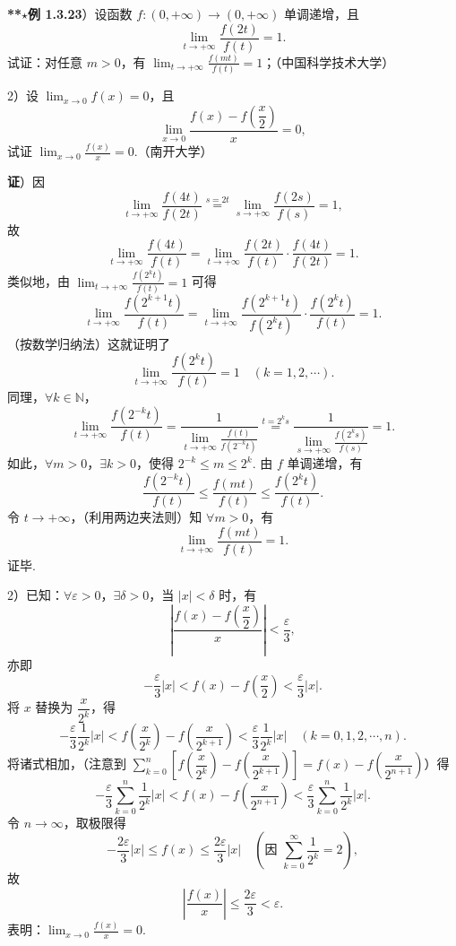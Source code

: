 \documentclass[UTF8, 12pt, fontset=fandol, oneside]{ctexart}
\begin{document}
\noindent\textbf{**$\star$例 1.3.23}）设函数 $f:(0,+\infty)\to(0,+\infty)$ 单调递增，且
\[
  \lim_{t\to+\infty}\frac{f(2t)}{f(t)}=1.
\]
试证：对任意 $m>0$，有 $\displaystyle\lim_{t\to+\infty}\frac{f(mt)}{f(t)}=1$；（中国科学技术大学）

2）设 $\displaystyle\lim_{x\to0}f(x)=0$，且
\[
  \lim_{x\to0}\frac{f(x)-f\left(\dfrac x2\right)}x=0,
\]
试证 $\displaystyle\lim_{x\to0}\frac{f(x)}x=0$.（南开大学）

\noindent\textbf{证}）因
\[
  \lim_{t\to+\infty}\frac{f(4t)}{f(2t)}
  \overset{s=2t}{=}
  \lim_{s\to+\infty}\frac{f(2s)}{f(s)}=1,
\]
故
\[
  \lim_{t\to+\infty}\frac{f(4t)}{f(t)}
  =\lim_{t\to+\infty}\frac{f(2t)}{f(t)}\cdot
  \frac{f(4t)}{f(2t)}=1.
\]
类似地，由 $\displaystyle\lim_{t\to+\infty}\frac{f(2^kt)}{f(t)}=1$ 可得
\[
  \lim_{t\to+\infty}\frac{f(2^{k+1}t)}{f(t)}
  =\lim_{t\to+\infty}
  \frac{f(2^{k+1}t)}{f(2^kt)}\cdot
  \frac{f(2^kt)}{f(t)}=1.
\]
（按数学归纳法）这就证明了
\[
  \lim_{t\to+\infty}\frac{f(2^kt)}{f(t)}=1\quad(k=1,2,\cdots).
\]
同理，$\forall k\in\mathbb N$，
\[
  \lim_{t\to+\infty}\frac{f(2^{-k}t)}{f(t)}
  =
  \frac{1}{\displaystyle\lim_{t\to+\infty}\frac{f(t)}{f(2^{-k}t)}}
  \overset{t=2^ks}{=}
  \frac{1}{\displaystyle\lim_{s\to+\infty}\frac{f(2^ks)}{f(s)}}=1.
\]
如此，$\forall m>0$，$\exists k>0$，使得 $2^{-k}\le m\le2^k$. 由 $f$ 单调递增，有
\[
  \frac{f(2^{-k}t)}{f(t)}
  \le\frac{f(mt)}{f(t)}
  \le\frac{f(2^kt)}{f(t)}.
\]
令 $t\to+\infty$，（利用两边夹法则）知 $\forall m>0$，有
\[
  \lim_{t\to+\infty}\frac{f(mt)}{f(t)}=1.
\]
证毕.

2）已知：$\forall\varepsilon>0$，$\exists\delta>0$，当 $|x|<\delta$ 时，有
\[
  \left|\frac{f(x)-f\left(\dfrac x2\right)}x\right|<\frac\varepsilon3,
\]
亦即
\[
  -\frac\varepsilon3|x|
  <f(x)-f\left(\frac x2\right)
  <\frac\varepsilon3|x|.
\]
将 $x$ 替换为 $\dfrac{x}{2^k}$，得
\[
  -\frac\varepsilon3\frac1{2^k}|x|
  <f\left(\frac{x}{2^k}\right)-f\left(\frac{x}{2^{k+1}}\right)
  <\frac\varepsilon3\frac1{2^k}|x|
  \quad(k=0,1,2,\cdots,n).
\]
将诸式相加，（注意到
$\displaystyle\sum_{k=0}^n\left[f\left(\dfrac{x}{2^k}\right)-f\left(\dfrac{x}{2^{k+1}}\right)\right]
=f(x)-f\left(\dfrac{x}{2^{n+1}}\right)$）得
\[
  -\frac\varepsilon3\sum_{k=0}^n\frac1{2^k}|x|
  <f(x)-f\left(\frac{x}{2^{n+1}}\right)
  <\frac\varepsilon3\sum_{k=0}^n\frac1{2^k}|x|.
\]
令 $n\to\infty$，取极限得
\[
  -\frac{2\varepsilon}{3}|x|\le f(x)\le\frac{2\varepsilon}{3}|x|
  \quad\left(\text{因 }\sum_{k=0}^\infty\frac1{2^k}=2\right),
\]
故
\[
  \left|\frac{f(x)}x\right|\le\frac{2\varepsilon}{3}<\varepsilon.
\]
表明：$\displaystyle\lim_{x\to0}\frac{f(x)}x=0$.
\end{document}
